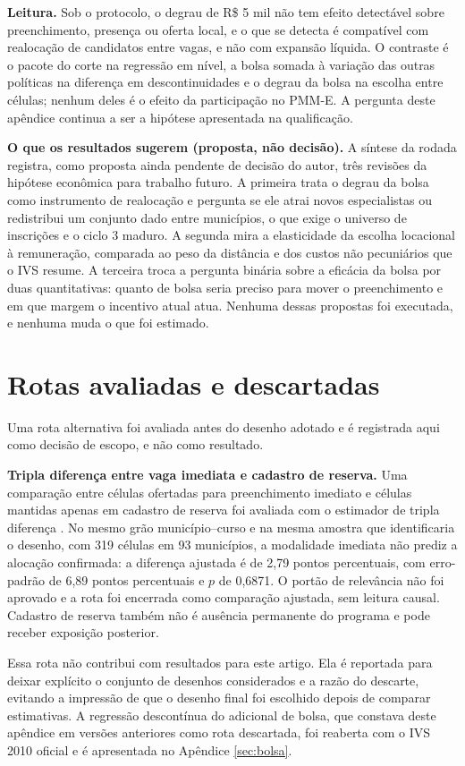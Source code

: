 \documentclass[11pt,a4paper]{article}
\begin{document}
\textbf{Leitura.} Sob o protocolo, o degrau de R\$ 5 mil não tem efeito
detectável sobre preenchimento, presença ou oferta local, e o que se detecta é
compatível com realocação de candidatos entre vagas, e não com expansão
líquida. O contraste é o pacote do corte na regressão em nível, a bolsa somada
à variação das outras políticas na diferença em descontinuidades e o degrau da
bolsa na escolha entre células; nenhum deles é o efeito da participação no
PMM-E. A pergunta deste apêndice continua a ser a hipótese apresentada na
qualificação.

\textbf{O que os resultados sugerem (proposta, não decisão).} A síntese da
rodada registra, como proposta ainda pendente de decisão do autor, três
revisões da hipótese econômica para trabalho futuro. A primeira trata o degrau
da bolsa como instrumento de realocação e pergunta se ele atrai novos
especialistas ou redistribui um conjunto dado entre municípios, o que exige o
universo de inscrições e o ciclo 3 maduro. A segunda mira a elasticidade da
escolha locacional à remuneração, comparada ao peso da distância e dos custos
não pecuniários que o IVS resume. A terceira troca a pergunta binária sobre a
eficácia da bolsa por duas quantitativas: quanto de bolsa seria preciso para
mover o preenchimento e em que margem o incentivo atual atua. Nenhuma dessas
propostas foi executada, e nenhuma muda o que foi estimado.

\section{Rotas avaliadas e descartadas}
\label{sec:rotas}

Uma rota alternativa foi avaliada antes do desenho adotado e é registrada aqui
como decisão de escopo, e não como resultado.

\textbf{Tripla diferença entre vaga imediata e cadastro de reserva.} Uma
comparação entre células ofertadas para preenchimento imediato e células mantidas
apenas em cadastro de reserva foi avaliada com o estimador de tripla diferença
\citep{olden2022}. No mesmo grão município--curso e na mesma amostra que
identificaria o desenho, com 319 células em 93 municípios, a modalidade imediata
não prediz a alocação confirmada: a diferença ajustada é de 2,79 pontos
percentuais, com erro-padrão de 6,89 pontos percentuais e $p$ de 0,6871. O portão
de relevância não foi aprovado e a rota foi encerrada como comparação ajustada,
sem leitura causal. Cadastro de reserva também não é ausência permanente do
programa e pode receber exposição posterior.

Essa rota não contribui com resultados para este artigo. Ela é reportada para
deixar explícito o conjunto de desenhos considerados e a razão do descarte,
evitando a impressão de que o desenho final foi escolhido depois de comparar
estimativas. A regressão descontínua do adicional de bolsa, que constava deste
apêndice em versões anteriores como rota descartada, foi reaberta com o IVS 2010
oficial e é apresentada no Apêndice \ref{sec:bolsa}.
\end{document}
